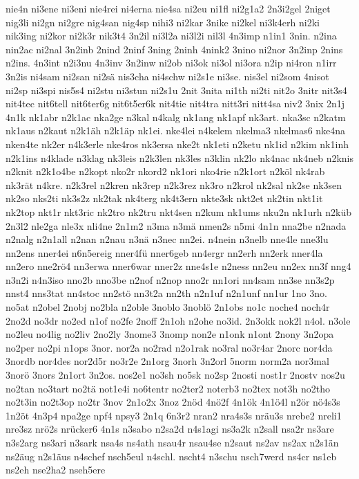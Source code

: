 {nie4n
ni3ene
ni3eni
nie4rei
ni4erna
nie4sa
ni2eu
ni1fl
ni2g1a2
2n3i2gel
2niget
nig3li
ni2gn
ni2gre
nig4san
nig4sp
nihi3
ni2kar
3nike
ni2kel
ni3k4erh
ni2ki
nik3ing
ni2kor
ni2k3r
nik3t4
3n2il
ni3l2a
ni3l2i
nil3l
4n3imp
n1in1
3nin.
n2ina
nin2ac
ni2nal
3n2inb
2nind
2ninf
3ning
2ninh
4nink2
3nino
ni2nor
3n2inp
2nins
n2ins.
4n3int
n2i3nu
4n3inv
3n2inw
ni2ob
ni3ok
ni3ol
ni3ora
n2ip
ni4ron
n1irr
3n2is
ni4sam
ni2san
ni2sä
nis3cha
ni4schw
ni2s1e
ni3se.
nis3el
ni2som
4nisot
ni2sp
ni3spi
nis5s4
ni2stu
ni3stun
ni2s1u
2nit
3nita
ni1th
ni2ti
nit2o
3nitr
nit3s4
nit4tec
nit6tell
nit6ter6g
nit6t5er6k
nit4tie
nit4tra
nitt3ri
nitt4sa
niv2
3nix
2n1j
4n1k
nk1abr
n2k1ac
nka2ge
n3kal
n4kalg
nk1ang
nk1apf
nk3art.
nka3sc
n2katm
nk1aus
n2kaut
n2k1äh
n2k1äp
nk1ei.
nke4lei
n4kelem
nkelma3
nkelmas6
nke4na
nken4te
nk2er
n4k3erle
nke4ros
nk3ersa
nke2t
nk1eti
n2ketu
nk1id
n2kim
nk1inh
n2k1ins
n4klade
n3klag
nk3leis
n2k3len
nk3les
n3klin
nk2lo
nk4nac
nk4neb
n2knis
n2knit
n2k1o4be
n2kopt
nko2r
nkord2
nk1ori
nko4rie
n2k1ort
n2köl
nk4rab
nk3rät
n4kre.
n2k3rel
n2kren
nk3rep
n2k3rez
nk3ro
n2krol
nk2sal
nk2se
nk3sen
nk2so
nks2ti
nk3s2z
nk2tak
nk4terg
nk4t3ern
nkte3sk
nkt2et
nk2tin
nkt1it
nk2top
nkt1r
nkt3ric
nk2tro
nk2tru
nkt4sen
n2kum
nk1ums
nku2n
nk1urh
n2küb
2n3l2
nle2ga
nle3x
nli4ne
2n1m2
n3ma
n3mä
nmen2s
n5mi
4n1n
nna2be
n2nada
n2nalg
n2n1all
n2nan
n2nau
n3nä
n3nec
nn2ei.
n4nein
n3nelb
nne4le
nne3lu
nn2ens
nner4ei
n6n5ereig
nner4fü
nner6geb
nn4ergr
nn2erh
nn2erk
nner4la
nn2ero
nne2rö4
nn3erwa
nner6war
nner2z
nne4s1e
n2ness
nn2eu
nn2ex
nn3f
nng4
n3n2i
n4n3iso
nno2b
nno3be
n2nof
n2nop
nno2r
nn1ori
nn4sam
nn3se
nn3s2p
nnst4
nns3tat
nn4stoc
nn2stö
nn3t2a
nn2th
n2n1uf
n2n1unf
nn1ur
1no
3no.
no5at
n2obel
2nobj
no2bla
n2oble
3noblo
3noblö
2n1obs
no1c
noche4
noch4r
2no2d
no3dr
no2ed
n1of
no2fe
2noff
2n1oh
n2ohe
no3id.
2n3okk
nok2l
n4ol.
n3ole
no2leu
no4lig
no2liv
2no2ly
3nome3
3nomp
non2e
n1onk
n1ont
2nony
3n2opa
no2per
no2pi
n1ops
3nor.
nor2a
no2rad
n2o1rak
no3ral
no3r4ar
2norc
nor4da
3nordb
nor4des
nor2d5r
no3r2e
2n1org
3norh
3n2orl
5norm
norm2a
nor3mal
3norö
3nors
2n1ort
3n2os.
nos2e1
no3sh
no5sk
no2sp
2nosti
nost1r
2nostv
nos2u
no2tan
no3tart
no2tä
not1e4i
no6tentr
no2ter2
noterb3
no2tex
not3h
no2tho
no2t3in
no2t3op
no2tr
3nov
2n1o2x
3noz
2nöd
4nö2f
4n1ök
4n1ö4l
n2ör
nö4s3s
1n2öt
4n3p4
npa2ge
npf4
npsy3
2n1q
6n3r2
nran2
nra4s3s
nräu3s
nrebe2
nreli1
nre3sz
nrö2s
nrücker6
4n1s
n3sabo
n2sa2d
n4s1agi
ns3a2k
n2sall
nsa2r
ns3are
n3s2arg
ns3ari
n3sark
nsa4s
ns4ath
nsau4r
nsau4se
n2saut
ns2av
ns2ax
n2s1än
ns2äug
n2s1äus
n4schef
nsch5eul
n4schl.
nscht4
n3schu
nsch7werd
ns4cr
ns1eb
ns2eh
nse2ha2
nseh5ere
}
